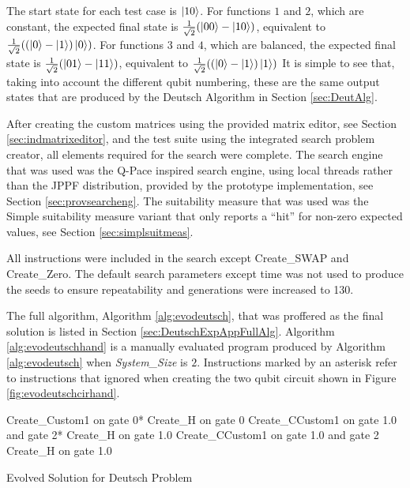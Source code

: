 The start state for each test case is $\left\vert{10}\right\rangle$.
For functions $1$ and $2$, which are constant, the expected final state is $\frac{1}{\sqrt{2}}(\left\vert{00}\right\rangle-\left\vert{10}\right\rangle)$, equivalent to $\frac{1}{\sqrt{2}}((\left\vert{0}\right\rangle-\left\vert{1}\right\rangle)\left\vert{0}\right\rangle)$.
For functions $3$ and $4$, which are balanced, the expected final state is $\frac{1}{\sqrt{2}}(\left\vert{01}\right\rangle-\left\vert{11}\right\rangle)$, equivalent to $\frac{1}{\sqrt{2}}((\left\vert{0}\right\rangle-\left\vert{1}\right\rangle)\left\vert{1}\right\rangle)$
It is simple to see that, taking into account the different qubit numbering, these are the same output states that are produced by the Deutsch Algorithm in Section \ref{sec:DeutAlg}.

After creating the custom matrices using the provided matrix editor, see Section \ref{sec:indmatrixeditor}, and the test suite using the integrated search problem creator, all elements required for the search were complete.
The search engine that was used was the Q-Pace inspired search engine, using local threads rather than the JPPF distribution, provided by the prototype implementation, see Section \ref{sec:provsearcheng}.
The suitability measure that was used was the Simple suitability measure variant that only reports a ``hit'' for non-zero expected values, see Section \ref{sec:simplsuitmeas}.

All instructions were included in the search except Create\_SWAP and Create\_Zero.
The default search parameters except time was not used to produce the seeds to ensure repeatability and generations were increased to 130.

The full algorithm, Algorithm \ref{alg:evodeutsch}, that was proffered as the final solution is listed in Section \ref{sec:DeutschExpAppFullAlg}.
Algorithm \ref{alg:evodeutschhand} is a manually evaluated program produced by Algorithm \ref{alg:evodeutsch} when \emph{System\_Size} is $2$.
Instructions marked by an asterisk refer to instructions that ignored when creating the two qubit circuit shown in Figure \ref{fig:evodeutschcirhand}.

\begin{algorithm}
 \begin{algorithmic}
\STATE Create\_Custom1 on gate 0*
\STATE Create\_H on gate 0
\STATE Create\_CCustom1 on gate 1.0 and gate 2*
\STATE Create\_H on gate 1.0
\STATE Create\_CCustom1 on gate 1.0 and gate 2
\STATE Create\_H on gate 1.0
 \end{algorithmic}
\caption{Evolved Solution for Deutsch Problem}
\label{alg:evodeutschhand}
\end{algorithm}

\begin{lstlisting}
\end{lstlisting}

